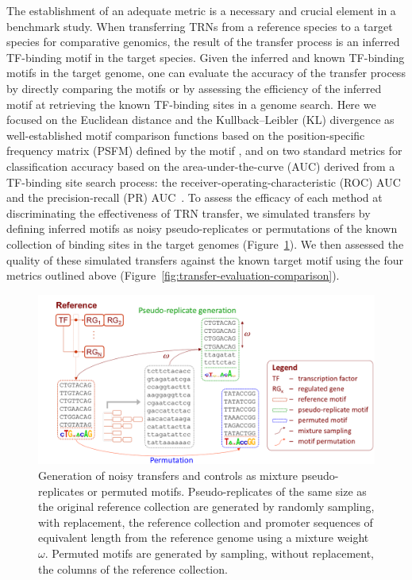 The establishment of an adequate metric is a necessary and crucial element in a
benchmark study. When transferring TRNs from a reference species to a target
species for comparative genomics, the result of the transfer process is an
inferred TF-binding motif in the target species. Given the inferred and known
TF-binding motifs in the target genome, one can evaluate the accuracy of the
transfer process by directly comparing the motifs or by assessing the
efficiency of the inferred motif at retrieving the known TF-binding sites in a
genome search. Here we focused on the Euclidean distance and the
Kullback–Leibler (KL) divergence as well-established motif comparison functions
based on the position-specific frequency matrix (PSFM) defined by the motif
\cite{gupta2007quantifying}, and on two standard metrics for classification
accuracy based on the area-under-the-curve (AUC) derived from a TF-binding site
search process: the receiver-operating-characteristic (ROC) AUC and the
precision-recall (PR) AUC~\cite{lewis1991evaluating, zweig1993receiver}. To
assess the efficacy of each method at discriminating the effectiveness of TRN
transfer, we simulated transfers by defining inferred motifs as noisy
pseudo-replicates or permutations of the known collection of binding sites in
the target genomes (Figure~\ref{fig:pseudoreplicate-generation}). We then
assessed the quality of these simulated transfers against the known target
motif using the four metrics outlined above
(Figure~\ref{fig:transfer-evaluation-comparison}).

\begin{figure}
  \centering
  \includegraphics[width=\textwidth]{figures/chapter3/pseudoreplicate-generation}
  \caption{Generation of noisy transfers and controls as mixture
    pseudo-replicates or permuted motifs. Pseudo-replicates of the same size as
    the original reference collection are generated by randomly sampling, with
    replacement, the reference collection and promoter sequences of equivalent
    length from the reference genome using a mixture weight $\omega$. Permuted
    motifs are generated by sampling, without replacement, the columns of the
    reference collection.}
\label{fig:pseudoreplicate-generation}
\end{figure}

